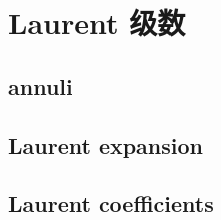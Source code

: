 \section{Laurent 级数}
\label{b3:sec:0301}


\subsection{annuli}
\label{b3:subsec:030101}

\subsection{Laurent expansion}
\label{b3:subsec:030102}

\subsection{Laurent coefficients}
\label{b3:subsec:030103}


